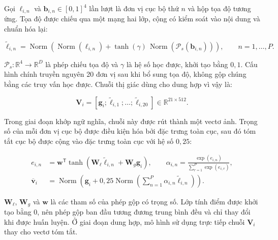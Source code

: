 Gọi $\boldsymbol{\ell}_{i,n}$ và $\boldsymbol{b}_{i,n}\in[0,1]^4$ lần lượt là đơn vị cục bộ thứ $n$ và hộp tọa độ tương ứng. Tọa độ được chiếu qua một mạng hai lớp, cộng có kiểm soát vào nội dung và chuẩn hóa lại:

\begin{equation}
\widetilde{\boldsymbol{\ell}}_{i,n}
=\operatorname{Norm}\!\left(
\operatorname{Norm}\!\left(\boldsymbol{\ell}_{i,n}\right)
+\tanh(\gamma)\,
\operatorname{Norm}\!\left(\mathcal{P}_{s}(\boldsymbol{b}_{i,n})\right)
\right),
\qquad n=1,\ldots,P.
\label{eq:ch3_spatial_encoding}
\end{equation}

$\mathcal{P}_{s}:\mathbb{R}^{4}\rightarrow\mathbb{R}^{D}$ là phép chiếu tọa độ và $\gamma$ là hệ số học được, khởi tạo bằng $0{,}1$. Cấu hình chính truyền nguyên 20 đơn vị sau khi bổ sung tọa độ, không gộp chúng bằng các truy vấn học được. Chuỗi thị giác dùng cho dung hợp vì vậy là:

\begin{equation}
\boldsymbol{V}_{i}
=\left[
\boldsymbol{g}_{i};
\widetilde{\boldsymbol{\ell}}_{i,1};\ldots;
\widetilde{\boldsymbol{\ell}}_{i,20}
\right]
\in\mathbb{R}^{21\times512}.
\label{eq:ch3_visual_sequence}
\end{equation}

Trong giai đoạn khớp ngữ nghĩa, chuỗi này được rút thành một vectơ ảnh. Trọng số của mỗi đơn vị cục bộ được điều kiện hóa bởi đặc trưng toàn cục, sau đó tóm tắt cục bộ được cộng vào đặc trưng toàn cục với hệ số $0{,}25$:

\begin{equation}
\begin{aligned}
e_{i,n}
&=\boldsymbol{w}^{\mathsf T}
\tanh\!\left(
\boldsymbol{W}_{\ell}\widetilde{\boldsymbol{\ell}}_{i,n}
+\boldsymbol{W}_{g}\boldsymbol{g}_i
\right),
\qquad
\alpha_{i,n}=\frac{\exp(e_{i,n})}{\sum_{r=1}^{P}\exp(e_{i,r})},\\
\overline{\boldsymbol{v}}_i
&=\operatorname{Norm}\!\left(
\boldsymbol{g}_i+0{,}25\operatorname{Norm}\!\left(
\sum_{n=1}^{P}\alpha_{i,n}
\widetilde{\boldsymbol{\ell}}_{i,n}
\right)
\right).
\end{aligned}
\label{eq:ch3_phase1_visual_summary}
\end{equation}

$\boldsymbol{W}_{\ell}$, $\boldsymbol{W}_{g}$ và $\boldsymbol{w}$ là các tham số của phép gộp có trọng số. Lớp tính điểm được khởi tạo bằng $0$, nên phép gộp ban đầu tương đương trung bình đều và chỉ thay đổi khi được huấn luyện. Ở giai đoạn dung hợp, mô hình sử dụng trực tiếp chuỗi $\boldsymbol{V}_i$ thay cho vectơ tóm tắt.

